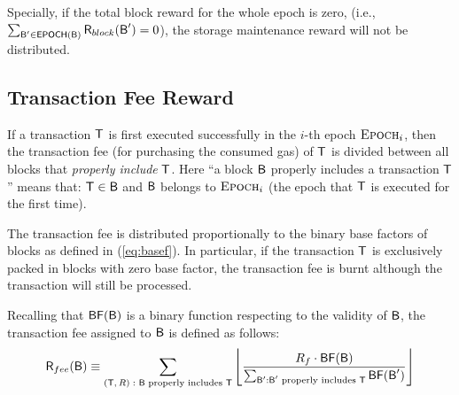 	Specially, if the total block reward for the whole epoch is zero, (i.e., $\sum_{\textsf{B}'\in\mathsf{EPOCH} (\textsf{B})} \textsf{R}_{block}(\textsf{B}')=0$), the storage maintenance reward will not be distributed. 




\subsection{Transaction Fee Reward}

If a transaction $\textsf{T}$ is first executed successfully in the $i$-th epoch $\textsc{Epoch}_i$, then 
the transaction fee (for purchasing the consumed gas) of $\textsf{T}$ is divided between all blocks that 
\emph{properly include }$\textsf{T}$.
Here ``a block $\textsf{B}$ properly includes a transaction $\textsf{T}$'' means that:
$\textsf{T}\in \textsf{B}$ and $\textsf{B}$ belongs to $\textsc{Epoch}_i$ (the epoch that $\textsf{T}$ is executed for the first time).


The transaction fee is distributed proportionally to the binary base factors of blocks as defined in (\ref{eq:basef}). 
% 
In particular, if the transaction $\textsf{T}$ is exclusively packed in blocks with zero base factor, the transaction fee is burnt although the transaction will still be processed. 

Recalling that $\mathsf{BF}(\textsf{B})$ is a binary function respecting to the validity of $\textsf{B}$,
 the transaction fee assigned to $\textsf{B}$ is defined as follows:
\begin{align}\label{eq:txfee}
	\textsf{R}_{fee}(\textsf{B})\equiv
		 \sum_{\text{$(\textsf{T},R):$ $\textsf{B}$ properly includes $\textsf{T}$}}
		 \left\lfloor
	\frac{R_f \cdot\mathsf{BF}(\textsf{B})}{\sum_{\textsf{B}': \text{$\textsf{B}'$ properly includes $\textsf{T}$}} \mathsf{BF}(\textsf{B}') }
		 \right\rfloor
\end{align}

